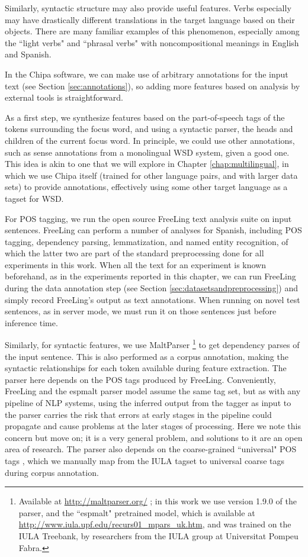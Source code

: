 Similarly, syntactic structure may also provide useful features.  Verbs
especially may have drastically different translations in the target language
based on their objects. There are many familiar examples of this phenomenon,
especially among the ``light verbs" and ``phrasal verbs" with noncompositional
meanings in English and Spanish.

In the Chipa software, we can make use of arbitrary annotations for the input
text (see Section \ref{sec:annotations}), so adding more features based on
analysis by external tools is straightforward.

As a first step, we synthesize features based on the part-of-speech tags of the
tokens surrounding the focus word, and using a syntactic parser,
the heads and children of the current focus word. In principle, we could use
other annotations, such as sense annotations from a monolingual WSD system,
given a good one. This idea is akin to one that we will explore in Chapter
\ref{chap:multilingual}, in which we use Chipa itself (trained for other
language pairs, and with larger data sets) to provide annotations, effectively
using some other target language as a tagset for WSD.

For POS tagging, we run the open source FreeLing text analysis suite
\cite{padro12} on input sentences. FreeLing can perform a number of analyses
for Spanish, including POS tagging, dependency parsing, lemmatization, and
named entity recognition, of which the latter two are part of the standard
preprocessing done for all experiments in this work. When all the text for an
experiment is known beforehand, as in the experiments reported in this chapter,
we can run FreeLing during the data annotation step (see Section
\ref{sec:datasetsandpreprocessing}) and simply record FreeLing's output as text
annotations. When running on novel test sentences, as in server mode, we must
run it on those sentences just before inference time.

Similarly, for syntactic features, we use MaltParser\cite{Nivre06maltparser:a}
\footnote{Available at \url{http://maltparser.org/} ; in this work we use
version 1.9.0 of the parser, and the ``espmalt" pretrained model, which is
available at \url{http://www.iula.upf.edu/recurs01_mpars_uk.htm}, and was
trained on the IULA Treebank\cite{MARIMON12.519}, by researchers from the IULA
group at Universitat Pompeu Fabra.} to get dependency parses of the input
sentence. This is also performed as a corpus annotation, making the syntactic
relationships for each token available during feature extraction. The parser
here depends on the POS tags produced by FreeLing. Conveniently, FreeLing and
the espmalt parser model assume the same tag set, but as with any pipeline of
NLP systems, using the inferred output from the tagger as input to the parser
carries the risk that errors at early stages in the pipeline could propagate
and cause problems at the later stages of processing. Here we note this concern
but move on; it is a very general problem, and solutions to it are an open area
of research. The parser also depends on the coarse-grained ``universal" POS
tags \cite{PETROV12.274}, which we manually map from the IULA tagset to
universal coarse tags during corpus annotation.


